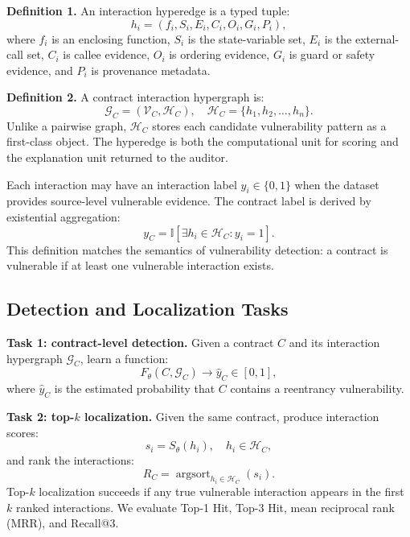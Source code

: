 \documentclass[conference]{IEEEtran}
\begin{document}
\textbf{Definition 1.} An interaction hyperedge is a typed tuple:
\begin{equation}
h_i=(f_i,S_i,E_i,C_i,O_i,G_i,P_i),
\end{equation}
where $f_i$ is an enclosing function, $S_i$ is the state-variable set, $E_i$ is the external-call set, $C_i$ is callee evidence, $O_i$ is ordering evidence, $G_i$ is guard or safety evidence, and $P_i$ is provenance metadata.

\textbf{Definition 2.} A contract interaction hypergraph is:
\begin{equation}
\mathcal{G}_C=(\mathcal{V}_C,\mathcal{H}_C), \quad
\mathcal{H}_C=\{h_1,h_2,\ldots,h_n\}.
\end{equation}
Unlike a pairwise graph, $\mathcal{H}_C$ stores each candidate vulnerability pattern as a first-class object. The hyperedge is both the computational unit for scoring and the explanation unit returned to the auditor.

Each interaction may have an interaction label $y_i\in\{0,1\}$ when the dataset provides source-level vulnerable evidence. The contract label is derived by existential aggregation:
\begin{equation}
y_C=\mathbb{I}\left[\exists h_i\in\mathcal{H}_C: y_i=1\right].
\end{equation}
This definition matches the semantics of vulnerability detection: a contract is vulnerable if at least one vulnerable interaction exists.

\subsection{Detection and Localization Tasks}

\textbf{Task 1: contract-level detection.} Given a contract $C$ and its interaction hypergraph $\mathcal{G}_C$, learn a function:
\begin{equation}
F_{\theta}(C,\mathcal{G}_C)\rightarrow \hat{y}_C\in[0,1],
\end{equation}
where $\hat{y}_C$ is the estimated probability that $C$ contains a reentrancy vulnerability.

\textbf{Task 2: top-$k$ localization.} Given the same contract, produce interaction scores:
\begin{equation}
s_i=S_{\theta}(h_i), \quad h_i\in\mathcal{H}_C,
\end{equation}
and rank the interactions:
\begin{equation}
R_C=\operatorname{argsort}_{h_i\in\mathcal{H}_C}(s_i).
\end{equation}
Top-$k$ localization succeeds if any true vulnerable interaction appears in the first $k$ ranked interactions. We evaluate Top-1 Hit, Top-3 Hit, mean reciprocal rank (MRR), and Recall@3.
\end{document}

